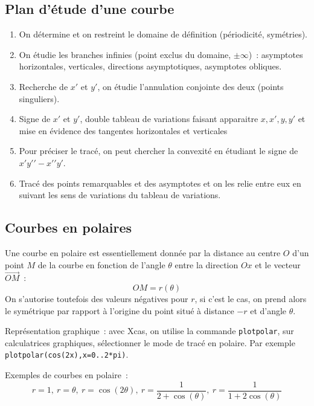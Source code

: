 \documentclass[a4paper,11pt]{article}
\begin{document}
\subsection{Plan d'\'etude d'une courbe}
\begin{enumerate}
\item On d\'etermine et on restreint le domaine de d\'efinition
(p\'eriodicit\'e, sym\'etries). 
\item On \'etudie les branches infinies (point exclus du domaine,
$\pm \infty$)~: asymptotes horizontales, verticales, directions
asymptotiques, asymptotes obliques.
\item Recherche de $x'$ et $y'$, on \'etudie l'annulation conjointe
  des deux (points singuliers).
\item Signe de $x'$ et $y'$, double tableau de variations faisant
apparaitre $x,x',y,y'$ et mise
en \'evidence des tangentes horizontales et verticales
\item Pour pr\'eciser le trac\'e, on peut chercher la convexit\'e
en \'etudiant le signe de $x'y'{'}-x'{'}y'$.
\item Trac\'e des points remarquables et des asymptotes et
on les relie entre eux en suivant les sens de variations
du tableau de variations.
\end{enumerate}

\subsection{Courbes en polaires}
Une courbe en polaire est essentiellement
donn\'ee par la distance au centre $O$ d'un
point $M$ de la courbe en fonction de l'angle $\theta$ 
entre la direction $Ox$ et le vecteur $\overrightarrow{OM}$~:
$$ OM = r(\theta)$$ 
On s'autorise toutefois des valeurs n\'egatives pour $r$,
si c'est le cas, on prend alors le sym\'etrique par rapport
\`a l'origine du point situ\'e \`a distance $-r$ et d'angle $\theta$.

Repr\'esentation graphique~: avec Xcas, on utilise
la commande \verb|plotpolar|, sur calculatrices
graphiques, s\'electionner le mode de trac\'e en polaire.
Par exemple \verb|plotpolar(cos(2x),x=0..2*pi)|.

Exemples de courbes en polaire~:
$$ r=1, \ r=\theta, \ r=\cos(2\theta), \ r=\frac{1}{2+\cos(\theta)},
\ r = \frac1{1+2\cos(\theta)}$$
\end{document}
